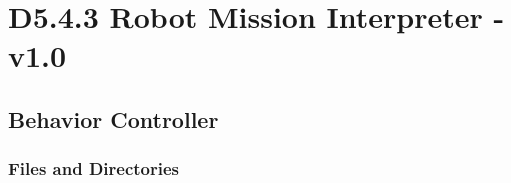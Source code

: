 \documentclass{CSSRforAfrica}
\begin{document}

\section{D5.4.3 Robot Mission Interpreter - v1.0} 
\subsection{Behavior Controller} 
\label{subsection:behaviour_controller}


\subsubsection{Files and Directories}
 
\end{document}
